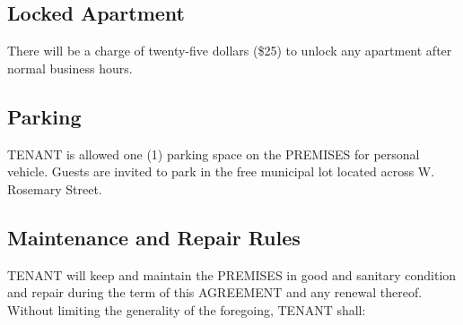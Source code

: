 \documentclass[11pt]{article}
\begin{document}
\subsection{Locked Apartment}
\label{sec:orgbc35e21}
There will be a charge of twenty-five dollars (\$25) to unlock any
apartment after normal business hours.

\subsection{Parking}
\label{sec:org8a5563d}
TENANT is allowed one (1) parking space on the PREMISES for personal
vehicle.  Guests are invited to park in the free municipal lot located
across W. Rosemary Street.

\subsection{Maintenance and Repair Rules}
\label{sec:org03f9f35}
TENANT will keep and maintain the PREMISES in good and sanitary
condition and repair during the term of this AGREEMENT and any renewal
thereof.  Without limiting the generality of the foregoing, TENANT
shall:
\end{document}
